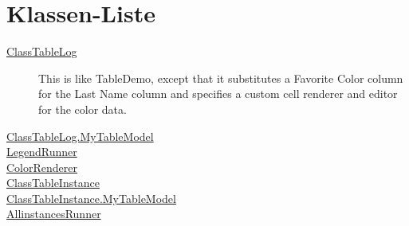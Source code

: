 \section{Klassen-Liste}
\begin{description}
\item[{\hyperlink{ontologyFramework.OFErrorManagement.OFGUI.allInstancesGUI.ClassTableLog-class}{ClassTableLog}}]
This is like TableDemo, except that it substitutes a
 Favorite Color column for the Last Name column and specifies
 a custom cell renderer and editor for the color data.
\hfill\pageref{ontologyFramework.OFErrorManagement.OFGUI.allInstancesGUI.ClassTableLog-class}

\item[{\hyperlink{ontologyFramework.OFErrorManagement.OFGUI.allInstancesGUI.ClassTableLog.MyTableModel-class}{ClassTableLog.MyTableModel}}]

\hfill\pageref{ontologyFramework.OFErrorManagement.OFGUI.allInstancesGUI.ClassTableLog.MyTableModel-class}

\item[{\hyperlink{ontologyFramework.OFErrorManagement.OFGUI.allInstancesGUI.LegendRunner-class}{LegendRunner}}]

\hfill\pageref{ontologyFramework.OFErrorManagement.OFGUI.allInstancesGUI.LegendRunner-class}

\item[{\hyperlink{ontologyFramework.OFErrorManagement.OFGUI.allInstancesGUI.ColorRenderer-class}{ColorRenderer}}]

\hfill\pageref{ontologyFramework.OFErrorManagement.OFGUI.allInstancesGUI.ColorRenderer-class}

\item[{\hyperlink{ontologyFramework.OFErrorManagement.OFGUI.allInstancesGUI.ClassTableInstance-class}{ClassTableInstance}}]

\hfill\pageref{ontologyFramework.OFErrorManagement.OFGUI.allInstancesGUI.ClassTableInstance-class}

\item[{\hyperlink{ontologyFramework.OFErrorManagement.OFGUI.allInstancesGUI.ClassTableInstance.MyTableModel-class}{ClassTableInstance.MyTableModel}}]

\hfill\pageref{ontologyFramework.OFErrorManagement.OFGUI.allInstancesGUI.ClassTableInstance.MyTableModel-class}

\item[{\hyperlink{ontologyFramework.OFErrorManagement.OFGUI.allInstancesGUI.AllinstancesRunner-class}{AllinstancesRunner}}]


\end{description}
